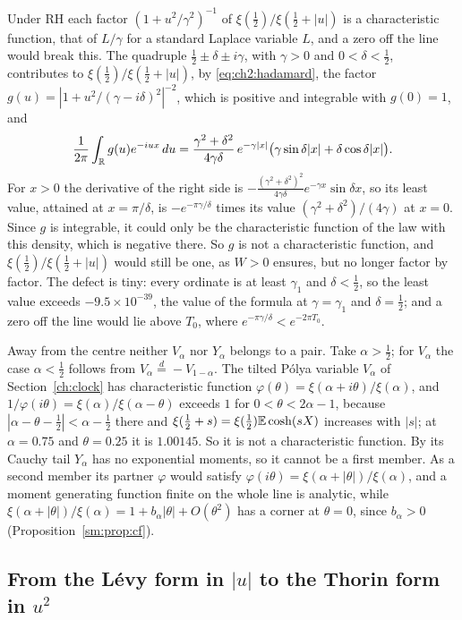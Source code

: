 Under RH each factor $(1+u^2/\gamma^2)^{-1}$ of $\xi(\frac12)/\xi(\frac12+|u|)$ is a characteristic function, that of $L/\gamma$ for a standard Laplace variable $L$, and a zero off the line would break this. The quadruple $\frac12\pm\delta\pm i\gamma$, with $\gamma>0$ and $0<\delta<\frac12$, contributes to $\xi(\frac12)/\xi(\frac12+|u|)$, by \eqref{eq:ch2:hadamard}, the factor $g(u)=|1+u^2/(\gamma-i\delta)^2|^{-2}$, which is positive and integrable with $g(0)=1$, and
\[
\frac1{2\pi}\int_{\mathbb{R}}g(u)e^{-iux}\,du=\frac{\gamma^2+\delta^2}{4\gamma\delta}\,e^{-\gamma|x|}\big(\gamma\sin\delta|x|+\delta\cos\delta|x|\big).
\]
For $x>0$ the derivative of the right side is $-\frac{(\gamma^2+\delta^2)^2}{4\gamma\delta}e^{-\gamma x}\sin\delta x$, so its least value, attained at $x=\pi/\delta$, is $-e^{-\pi\gamma/\delta}$ times its value $(\gamma^2+\delta^2)/(4\gamma)$ at $x=0$. Since $g$ is integrable, it could only be the characteristic function of the law with this density, which is negative there. So $g$ is not a characteristic function, and $\xi(\frac12)/\xi(\frac12+|u|)$ would still be one, as $W>0$ ensures, but no longer factor by factor. The defect is tiny: every ordinate is at least $\gamma_1$ and $\delta<\frac12$, so the least value exceeds $-9.5\times10^{-39}$, the value of the formula at $\gamma=\gamma_1$ and $\delta=\frac12$; and a zero off the line would lie above $T_0$, where $e^{-\pi\gamma/\delta}<e^{-2\pi T_0}$.

Away from the centre neither $V_\alpha$ nor $Y_\alpha$ belongs to a pair. Take $\alpha>\frac12$; for $V_\alpha$ the case $\alpha<\frac12$ follows from $V_\alpha\stackrel d=-V_{1-\alpha}$. The tilted P\'olya variable $V_\alpha$ of Section~\ref{ch:clock} has characteristic function $\varphi(\theta)=\xi(\alpha+i\theta)/\xi(\alpha)$, and $1/\varphi(i\theta)=\xi(\alpha)/\xi(\alpha-\theta)$ exceeds $1$ for $0<\theta<2\alpha-1$, because $|\alpha-\theta-\frac12|<\alpha-\frac12$ there and $\xi(\frac12+s)=\xi(\frac12)\mathbb{E}\cosh(sX)$ increases with $|s|$; at $\alpha=0.75$ and $\theta=0.25$ it is $1.00145$. So it is not a characteristic function. By its Cauchy tail $Y_\alpha$ has no exponential moments, so it cannot be a first member. As a second member its partner $\varphi$ would satisfy $\varphi(i\theta)=\xi(\alpha+|\theta|)/\xi(\alpha)$, and a moment generating function finite on the whole line is analytic, while $\xi(\alpha+|\theta|)/\xi(\alpha)=1+b_\alpha|\theta|+O(\theta^2)$ has a corner at $\theta=0$, since $b_\alpha>0$ (Proposition~\ref{sm:prop:cf}).

\subsection{From the L\'evy form in \texorpdfstring{$|u|$}{|u|} to the Thorin form in \texorpdfstring{$u^2$}{u2}}\label{sm:sec:thorin}

